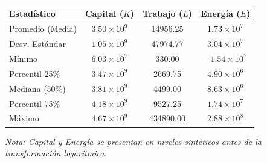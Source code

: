 {	\begin{center}
		\begin{tabular}{l c c c}
			\hline
			\textbf{Estadístico} & \textbf{Capital ($K$)} & \textbf{Trabajo ($L$)} & \textbf{Energía ($E$)} \\
			\hline
			Promedio (Media)     & $3.50 \times 10^9$     & 14956.25               & $1.73 \times 10^7$     \\
			Desv. Estándar       & $1.05 \times 10^9$     & 47974.77               & $3.04 \times 10^7$     \\
			Mínimo               & $6.03 \times 10^7$     & 330.00                 & $-1.54 \times 10^7$    \\
			\hline
			Percentil 25\%       & $3.47 \times 10^9$     & 2669.75                & $4.90 \times 10^6$     \\
			Mediana (50\%)       & $3.81 \times 10^9$     & 4499.00                & $8.63 \times 10^6$     \\
			Percentil 75\%       & $4.18 \times 10^9$     & 9527.25                & $1.74 \times 10^7$     \\
			Máximo               & $4.67 \times 10^9$     & 434890.00              & $2.88 \times 10^8$     \\
			\hline
		\end{tabular}
	\end{center}
	\vspace{1em}
	\small \textit{Nota: Capital y Energía se presentan en niveles sintéticos antes de la transformación logarítmica.}
}
